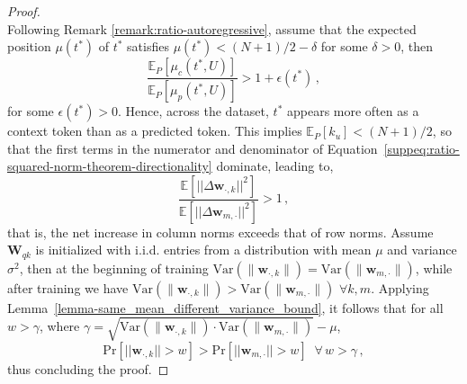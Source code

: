 \begin{proof}
\begin{equation}
\end{equation}
%
Following Remark \ref{remark:ratio-autoregressive}, assume that the expected position \( \mu(t^*) \) of \( t^* \) satisfies \( \mu(t^*) < (N+1)/2 - \delta \) for some \( \delta > 0 \), then
%
\begin{equation}
\frac{\mathbb{E}_P[\mu_c(t^*, U)]}{\mathbb{E}_P[\mu_p(t^*, U)]} > 1 + \epsilon(t^*)\,,
\end{equation}
%
for some \( \epsilon(t^*) > 0 \).
%
Hence, across the dataset, \( t^* \) appears more often as a context token than as a predicted token. 
%
This implies \( \mathbb{E}_P[k_u] < (N+1)/2 \), so that the first terms in the numerator and denominator of Equation~\eqref{suppeq:ratio-squared-norm-theorem-directionality} dominate, leading to, 
%
\begin{equation}
\frac{\mathbb{E}\left[ ||\Delta \bm{w}_{\cdot, k}||^2 \right]}{\mathbb{E}\left[ ||\Delta \bm{w}_{m, \cdot}||^2 \right]} > 1 \,,
\end{equation}
%
that is, the net increase in column norms exceeds that of row norms.
%
Assume \( \bm{W}_{qk} \) is initialized with i.i.d. entries from a distribution with mean \( \mu \) and variance \( \sigma^2 \), then at the beginning of training
$\mathrm{Var}(\|\bm{w}_{\cdot, k}\|) = \mathrm{Var}(\|\bm{w}_{m, \cdot}\|)
$, while after training we have
%
$
\mathrm{Var}(\|\bm{w}_{\cdot, k}\|) > \mathrm{Var}(\|\bm{w}_{m, \cdot}\|) \,\,\forall k, m.
$
Applying Lemma~\ref{lemma-same_mean_different_variance_bound}, it follows that for all \( w > \gamma \), where \( \gamma = \sqrt{ \mathrm{Var}(\|\bm{w}_{\cdot, k}\|) \cdot \mathrm{Var}(\|\bm{w}_{m, \cdot}\|)} - \mu \),
\begin{equation}
    \text{Pr}[||\bm{w}_{\cdot, k}|| > w] > \text{Pr}[|| \bm{w}_{m, \cdot}|| > w] \,\,\ \forall \,w > \gamma \,,
\end{equation}
% 
thus concluding the proof.
%
\end{proof}